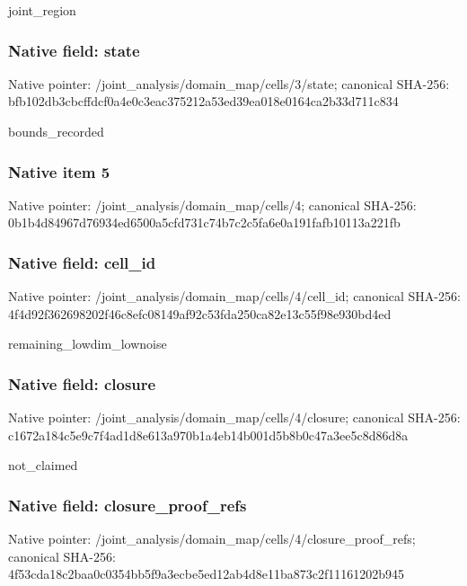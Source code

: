 \documentclass[10pt,a4paper]{article}
\begin{document}
joint\_region


\subsubsection{Native field: state}


Native pointer: /joint\_analysis/domain\_m\allowbreak{}ap/cells/3/state; canonical SHA-256: bfb102db3cbcffdcf0a4e0c3\allowbreak{}eac375212a53ed39ea018e01\allowbreak{}64ca2b33d711c834


bounds\_recorded


\subsubsection{Native item 5}


Native pointer: /joint\_analysis/domain\_map/cells/4; canonical SHA-256: 0b1b4d84967d76934ed6500a\allowbreak{}5cfd731c74b7c2c5fa6e0a19\allowbreak{}1fafb10113a221fb



\subsubsection{Native field: cell\_id}


Native pointer: /joint\_analysis/domain\_m\allowbreak{}ap/cells/4/cell\_id; canonical SHA-256: 4f4d92f362698202f46c8efc\allowbreak{}08149af92c53fda250ca82e1\allowbreak{}3c55f98e930bd4ed


remaining\_lowdim\_lownoise


\subsubsection{Native field: closure}


Native pointer: /joint\_analysis/domain\_m\allowbreak{}ap/cells/4/closure; canonical SHA-256: c1672a184c5e9c7f4ad1d8e6\allowbreak{}13a970b1a4eb14b001d5b8b0\allowbreak{}c47a3ee5c8d86d8a


not\_claimed


\subsubsection{Native field: closure\_proof\_refs}


Native pointer: /joint\_analysis/domain\_m\allowbreak{}ap/cells/4/closure\_proof\allowbreak{}\_refs; canonical SHA-256: 4f53cda18c2baa0c0354bb5f\allowbreak{}9a3ecbe5ed12ab4d8e11ba87\allowbreak{}3c2f11161202b945
\end{document}
